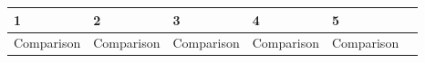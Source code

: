 \bigskip
{
\scriptsize
\begin{tabular}{|p{1.5cm}|p{2.5cm}|p{2.5cm}|p{2.5cm}|p{2.5cm}|p{2.5cm}|}
\hline
\textbf{1} & \textbf{2} & \textbf{3} & \textbf{4} & \textbf{5} \\
\hline
Comparison & Comparison & Comparison & Comparison & Comparison  \\
\hline
\end{tabular}
}
\bigskip